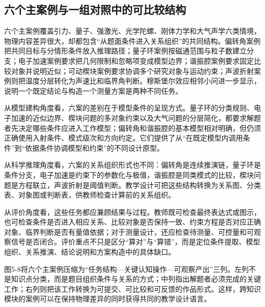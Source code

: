 \documentclass[
  12pt,
  a4paper,twoside,openany]{ctexbook}
\begin{document}
\subsection{六个主案例与一组对照中的可比较结构}\label{ux516dux4e2aux4e3bux6848ux4f8bux4e0eux4e00ux7ec4ux5bf9ux7167ux4e2dux7684ux53efux6bd4ux8f83ux7ed3ux6784}

六个主案例覆盖引力、量子、强激光、光学陀螺、刚体力学和大气声学六类情境，物理内容差异很大，却都包含``从题面条件进入关系组织''的共同结构。偏转角案例把共同目标与分情形条件放入推理路径；量子环案例按磁通范围与粒子数建立分支；电子加速案例要求把几何限制和忽略项变成模型边界；谐振腔案例要求固定比较对象并说明近似；可动楔块案例要求协调多个研究对象与运动约束；声波折射案例则把温度分层转化为声速比和临界角判断。穆斯堡尔效应相邻小问进一步显示，说明一个既定结论与构造一个测量方案是两种不同任务。

从模型建构角度看，六案的差别在于模型条件的呈现方式。量子环的分类规则、电子加速的近似边界、楔块问题的多对象约束以及大气问题的分层简化，都要求解题者先决定哪些条件应进入工作模型；偏转角和谐振腔的基本模型相对明确，但仍须正确使用入射条件、模式级次和方向约定。它们提供了从``在既定模型内调用条件''到``依据条件协调模型和约束''的不同设计原型。

从科学推理角度看，六案的关系组织形式也不同：偏转角是连续推演链，量子环是条件分支，电子加速是约束下的参数化与极值，谐振腔是同类模式的比较，楔块问题是方程联立，声波折射是阈值判断。教学设计可把这些结构转换为关系图、分类表、对象图或判断表，供教师检查计算前的关系组织。

从评价角度看，这些任务都应兼顾结果与过程。教师既可检查最终表达式或图示，也可检查条件是否进入相应关系、比较对象是否保持一致、约束方程是否对应正确对象、临界判断是否有量值依据；对于测量设计，还应检查待测量、可控量和可观察信号是否闭合。评价重点不只是区分``算对''与``算错''，而是定位条件提取、模型组织、关系推演、结论说明和方案构造中的具体缺口。

图5-8将六个主案例压缩为``任务结构---关键认知操作---可观察产出''三列。左列不是知识点分类，而是题目组织条件与关系的方式；中列指出解题者必须完成的关键工作；右列则把该工作转换为可提交、可比较和可反馈的作品形式。这样，跨知识模块的案例可以在保持物理差异的同时获得共同的教学设计语言。
\end{document}
